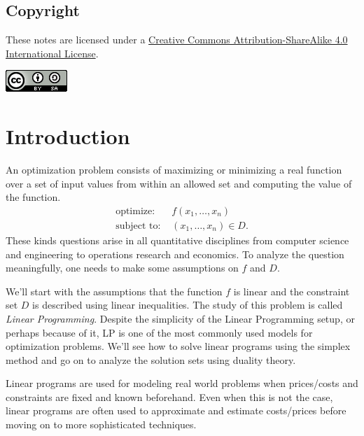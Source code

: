\documentclass[
]{book}
\theoremstyle{definition}
\theoremstyle{definition}
\theoremstyle{definition}
\theoremstyle{definition}
\theoremstyle{remark}
\begin{document}
\hypertarget{copyright}{%
\section*{Copyright}\label{copyright}}

These notes are licensed under a \href{\%5Bhttp://creativecommons.org/licenses/by-sa/4.0/\%5D(http://creativecommons.org/licenses/by-sa/4.0/)}{Creative Commons Attribution-ShareAlike 4.0 International License}.

\includegraphics{images/cc-by-sa-4.png}

\hypertarget{introduction}{%
\chapter{Introduction}\label{introduction}}

An optimization problem consists of maximizing or minimizing a real function over a set of input values from within an allowed set and computing the value of the function.
\begin{align*}
\mbox{optimize: } & f(x_1, \dots, x_n) \\
\mbox{subject to: } & (x_1, \dots, x_n) \in D.
\end{align*}
These kinds questions arise in all quantitative disciplines from computer science and engineering to operations research and economics.
To analyze the question meaningfully, one needs to make some assumptions on \(f\) and \(D\).

We'll start with the assumptions that the function \(f\) is linear and the constraint set \(D\) is described using linear inequalities. The study of this problem is called \emph{Linear Programming}. Despite the simplicity of the Linear Programming setup, or perhaps because of it, LP is one of the most commonly used models for optimization problems. We'll see how to solve linear programs using the simplex method and go on to analyze the solution sets using duality theory.

Linear programs are used for modeling real world problems when prices/costs and constraints are fixed and known beforehand.
Even when this is not the case, linear programs are often used to approximate and estimate costs/prices before moving on to more sophisticated techniques.
\end{document}
